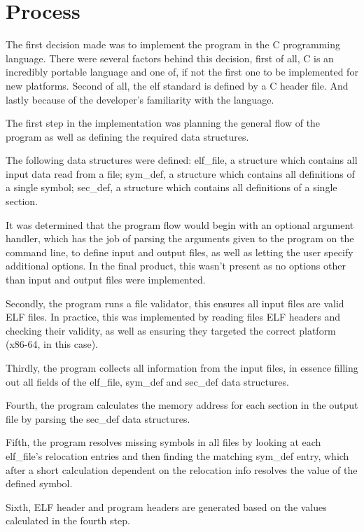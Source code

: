 \documentclass[notitlepage]{report}
\begin{document}
\section{Process}

The first decision made was to implement the program in the C programming language. There were several factors behind this decision, first of all, C is an incredibly portable language and one of, if not the first one to be implemented for new platforms. Second of all, the elf standard is defined by a C header file. And lastly because of the developer's familiarity with the language.

The first step in the implementation was planning the general flow of the program as well as defining the required data structures.

The following data structures were defined: elf\_file, a structure which contains all input data read from a file; sym\_def, a structure which contains all definitions of a single symbol; sec\_def, a structure which contains all definitions of a single section.

It was determined that the program flow would begin with an optional argument handler, which has the job of parsing the arguments given to the program on the command line, to define input and output files, as well as letting the user specify additional options. In the final product, this wasn't present as no options other than input and output files were implemented.

Secondly, the program runs a file validator, this ensures all input files are valid ELF files. In practice, this was implemented by reading files ELF headers and checking their validity, as well as ensuring they targeted the correct platform (x86-64, in this case).

Thirdly, the program collects all information from the input files, in essence filling out all fields of the elf\_file, sym\_def and sec\_def data structures.

Fourth, the program calculates the memory address for each section in the output file by parsing the sec\_def data structures.

Fifth, the program resolves missing symbols in all files by looking at each elf\_file's relocation entries and then finding the matching sym\_def entry, which after a short calculation dependent on the relocation info resolves the value of the defined symbol.

Sixth, ELF header and program headers are generated based on the values calculated in the fourth step.
\end{document}
